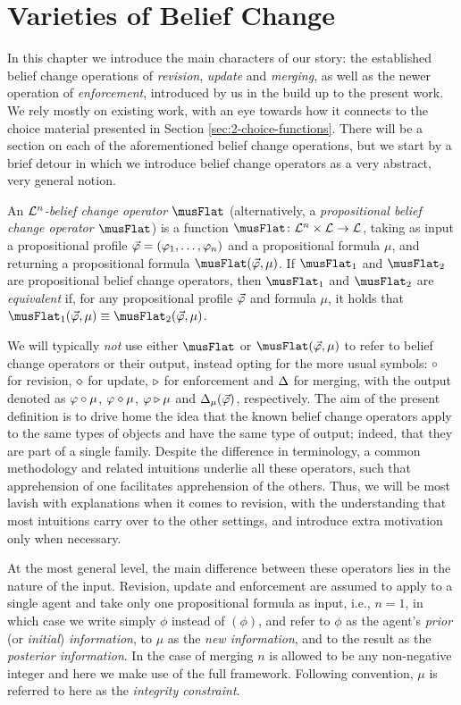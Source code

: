 \chapter{Varieties of Belief Change}\label{ch:3}

In this chapter we introduce the main characters of our story:
the established belief change operations of 
\emph{revision}, 
\emph{update} 
and \emph{merging},
as well as the newer operation of \emph{enforcement}, 
introduced by us in the build up to the present work.
We rely mostly on existing work, with an eye towards 
how it connects to the choice material 
presented in Section \ref{sec:2-choice-functions}.
There will be a section on each of the aforementioned 
belief change operations, but we start by a brief detour 
in which we introduce belief change operators 
as a very abstract, very general notion.

An \emph{$\L^n$-belief change operator $\bc$}
(alternatively, a \emph{propositional belief change operator $\bc$}) 
is a function $\bc\colon\L^n\times\L\rightarrow\L$,
taking as input a propositional profile 
$\P=(\phi_1,\dots,\phi_n)$
and a propositional formula $\mu$,
and returning a propositional formula $\bc(\P,\mu)$.
If $\bc_1$ and $\bc_2$ are propositional belief change operators,
then $\bc_1$ and $\bc_2$ are \emph{equivalent}
if, for any propositional profile $\P$ and formula $\mu$,
it holds that $\bc_{1}(\P,\mu)\equiv \bc_{2}(\P,\mu)$.

We will typically \emph{not} use either $\bc$ or $\bc(\P,\mu)$ 
to refer to belief change operators or their output, 
instead opting for the more usual symbols: 
$\re$ for revision, $\up$ for update, 
$\en$ for enforcement and $\me$ for merging,
with the output denoted as $\phi\re\mu$, $\phi\up\mu$, 
$\phi\en\mu$ and $\me_\mu(\P)$, respectively.
The aim of the present definition is to drive home 
the idea that the known belief change operators apply to the same 
types of objects and have the same type of output; 
indeed, that they are part of a single family.
Despite the difference in terminology,
a common methodology and related intuitions 
underlie all these operators,
such that apprehension of one 
facilitates apprehension of the others. 
Thus, we will be most lavish
with explanations when it comes to revision, 
with the understanding that most intuitions 
carry over to the other settings,
and introduce extra motivation only when necessary.

At the most general level, the main difference between these operators
lies in the nature of the input.
Revision, update and enforcement are assumed to apply to a single agent and 
take only one propositional formula as input, i.e., $n=1$,
in which case we write simply $\phi$ instead of $(\phi)$,
and refer to $\phi$ as the agent's \emph{prior} 
(or \emph{initial}) \emph{information},
to $\mu$ as the \emph{new information},
and to the result as the \emph{posterior information}.
In the case of merging $n$ is allowed to be 
any non-negative integer and here we make use of the full framework.
Following convention, $\mu$ is referred 
to here as the \emph{integrity constraint}.

